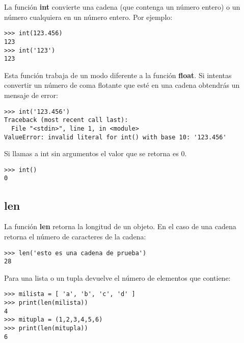 La función \textbf{int} convierte una cadena (que contenga un número entero) o un número cualquiera en un número entero. Por ejemplo:

\begin{listing}
\begin{verbatim}
>>> int(123.456)
123
>>> int('123')
123
\end{verbatim}
\end{listing}

Esta función trabaja de un modo diferente a la función \textbf{float}. Si intentas convertir un número de coma flotante que esté en una cadena obtendrás un mensaje de error:

\begin{listing}
\begin{verbatim}
>>> int('123.456')
Traceback (most recent call last):
  File "<stdin>", line 1, in <module>
ValueError: invalid literal for int() with base 10: '123.456'
\end{verbatim}
\end{listing}

\noindent
Si llamas a int sin argumentos el valor que se retorna es 0.

\begin{listing}
\begin{verbatim}
>>> int()
0
\end{verbatim}
\end{listing}

\noindent

\subsection*{len}

La función \textbf{len} retorna la longitud de un objeto.   En el caso de una cadena retorna el número de caracteres de la cadena:

\begin{listing}
\begin{verbatim}
>>> len('esto es una cadena de prueba')
28
\end{verbatim}
\end{listing}

\noindent
Para una lista o un tupla devuelve el número de elementos que contiene:

\begin{listing}
\begin{verbatim}
>>> milista = [ 'a', 'b', 'c', 'd' ]
>>> print(len(milista))
4
>>> mitupla = (1,2,3,4,5,6)
>>> print(len(mitupla))
6
\end{verbatim}
\end{listing}

